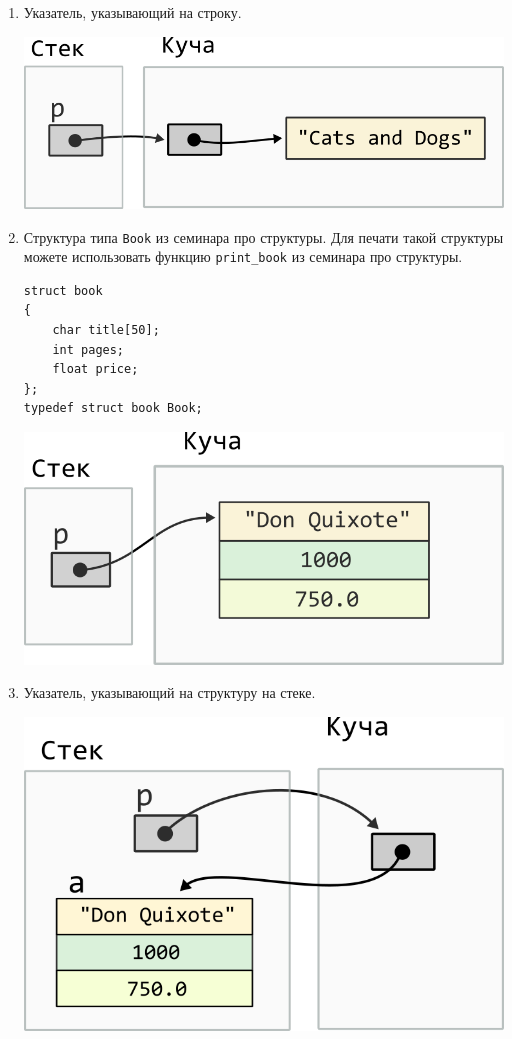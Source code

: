 \documentclass[10pt]{article}
\newcommand{\mallocImagesScale}{0.72}
\begin{document}
\begin{enumerate}
\item Указатель, указывающий на строку.
\begin{center}
\includegraphics[scale=\mallocImagesScale]{../images/malloc_homework/02heap_pointer_char_array.png}
\end{center}


\item Структура типа \texttt{Book} из семинара про структуры. Для печати такой структуры можете использовать функцию \texttt{print\_book} из семинара про структуры.
\begin{lstlisting}
struct book 
{
    char title[50];
    int pages;
    float price;
};
typedef struct book Book;
\end{lstlisting}
\begin{center}
\includegraphics[scale=\mallocImagesScale]{../images/malloc_homework/03heap_struct_book.png}
\end{center}

\newpage
\item Указатель, указывающий на структуру на стеке.
\begin{center}
\includegraphics[scale=\mallocImagesScale]{../images/malloc_homework/04heap_pointer_stack_struct_book.png}
\end{center}



\end{enumerate}
\end{document}
